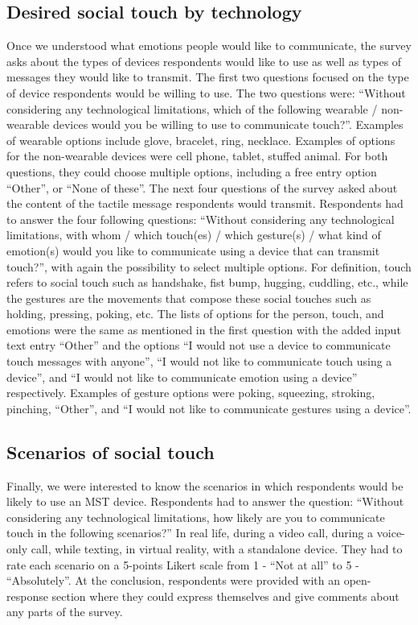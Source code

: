 \documentclass[acmsmall]{acmart}
\begin{document}
\subsection{Desired social touch by technology}
Once we understood what emotions people would like to communicate, the survey asks about the types of devices respondents would like to use as well as types of messages they would like to transmit. The first two questions focused on the type of device respondents would be willing to use. The two questions were: “Without considering any technological limitations, which of the following wearable / non-wearable devices would you be willing to use to communicate touch?”. Examples of wearable options include glove, bracelet, ring, necklace. Examples of options for the non-wearable devices were cell phone, tablet, stuffed animal. For both questions, they could choose multiple options, including a free entry option “Other”, or “None of these”. The next four questions of the survey asked about the content of the tactile message respondents would transmit. Respondents had to answer the four following questions: “Without considering any technological limitations, with whom / which touch(es) / which gesture(s) / what kind of emotion(s) would you like to communicate using a device that can transmit touch?”, with again the possibility to select multiple options. For definition, touch refers to social touch such as handshake, fist bump, hugging, cuddling, etc., while the gestures are the movements that compose these social touches such as holding, pressing, poking, etc. The lists of options for the person, touch, and emotions were the same as mentioned in the first question with the added input text entry “Other” and the options “I would not use a device to communicate touch messages with anyone”, “I would not like to communicate touch using a device”, and “I would not like to communicate emotion using a device” respectively. Examples of gesture options were poking, squeezing, stroking, pinching, “Other”, and “I would not like to communicate gestures using a device”.

\subsection{Scenarios of social touch}
Finally, we were interested to know the scenarios in which respondents would be likely to use an MST device. Respondents had to answer the question: “Without considering any technological limitations, how likely are you to communicate touch in the following scenarios?” In real life, during a video call, during a voice-only call, while texting, in virtual reality, with a standalone device. They had to rate each scenario on a 5-points Likert scale from 1 - “Not at all” to 5 - “Absolutely”.
At the conclusion, respondents were provided with an open-response section where they could express themselves and give comments about any parts of the survey.
\end{document}

